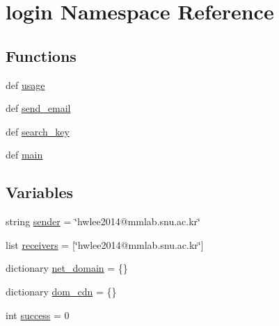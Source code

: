 \hypertarget{namespacelogin}{\section{login Namespace Reference}
\label{namespacelogin}
}
\subsection*{Functions}
\begin{DoxyCompactItemize}
\item 
def \hyperlink{namespacelogin_a889d0de8518693911c4e8f6d8a0637e5}{usage}
\item 
def \hyperlink{namespacelogin_a797f688239de092d274b8ad0a46ebc07}{send\-\_\-email}
\item 
def \hyperlink{namespacelogin_a05591a8e7af6a2a0adb95b4a119d5b53}{search\-\_\-key}
\item 
def \hyperlink{namespacelogin_a8e8271a54fff35142e251ef544b9fbdd}{main}
\end{DoxyCompactItemize}
\subsection*{Variables}
\begin{DoxyCompactItemize}
\item 
string \hyperlink{namespacelogin_ad3176ba8aabb34ee9d462bfc5759e813}{sender} = \char`\"{}hwlee2014@mmlab.\-snu.\-ac.\-kr\char`\"{}
\item 
list \hyperlink{namespacelogin_ade3e5984792c8f664dc0de258e3a5cf7}{receivers} = \mbox{[}\char`\"{}hwlee2014@mmlab.\-snu.\-ac.\-kr\char`\"{}\mbox{]}
\item 
dictionary \hyperlink{namespacelogin_ac8b5f0b9048cd35103eaa2642535c676}{net\-\_\-domain} = \{\}
\item 
dictionary \hyperlink{namespacelogin_a5a1b5b510aa4e7364899bca2d98bfc73}{dom\-\_\-cdn} = \{\}
\item 
int \hyperlink{namespacelogin_a343cc2be9c464c78c5d4227471e75d58}{success} = 0
\end{DoxyCompactItemize}


